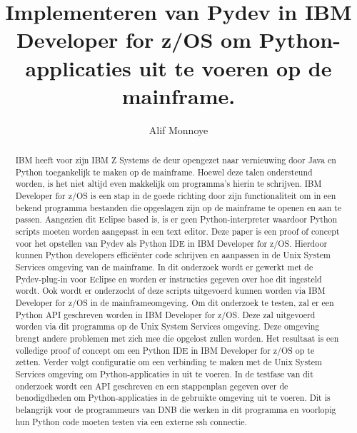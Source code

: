 \documentclass[a0,portrait]{hogent-poster}
\title{Implementeren van Pydev in IBM Developer for z/OS om Python-applicaties uit te voeren op de mainframe.}
\author{Alif Monnoye}
\begin{document}
\maketitle

\begin{abstract}
IBM heeft voor zijn IBM Z Systems de deur opengezet naar vernieuwing door Java
en Python toegankelijk te maken op de mainframe. Hoewel deze talen ondersteund
worden, is het niet altijd even makkelijk om programma’s hierin te schrijven.
IBM Developer for z/OS is een stap in de goede richting door zijn functionaliteit om
in een bekend programma bestanden die opgeslagen zijn op de mainframe te openen
en aan te passen. Aangezien dit Eclipse based is, is er geen Python-interpreter
waardoor Python scripts moeten worden aangepast in een text editor.
Deze paper is een proof of concept voor het opstellen van Pydev als Python IDE in
IBM Developer for z/OS. Hierdoor kunnen Python developers efficiënter code schrijven
en aanpassen in de Unix System Services omgeving van de mainframe.
In dit onderzoek wordt er gewerkt met de Pydev-plug-in voor Eclipse en worden er
instructies gegeven over hoe dit ingesteld wordt. Ook wordt er onderzocht of deze
scripts uitgevoerd kunnen worden via IBM Developer for z/OS in de mainframeomgeving.
Om dit onderzoek te testen, zal er een Python API geschreven worden in IBM Developer
for z/OS. Deze zal uitgevoerd worden via dit programma op de Unix System
Services omgeving. Deze omgeving brengt andere problemen met zich mee die
opgelost zullen worden.
Het resultaat is een volledige proof of concept om een Python IDE in IBM Developer
for z/OS op te zetten. Verder volgt configuratie om een verbinding te maken
met de Unix System Services omgeving om Python-applicaties in uit te voeren. In
de testfase van dit onderzoek wordt een API geschreven en een stappenplan gegeven
over de benodigdheden om Python-applicaties in de gebruikte omgeving
uit te voeren. Dit is belangrijk voor de programmeurs van DNB die werken in dit
programma en voorlopig hun Python code moeten testen via een externe ssh connectie.
\end{abstract}
\end{document}
